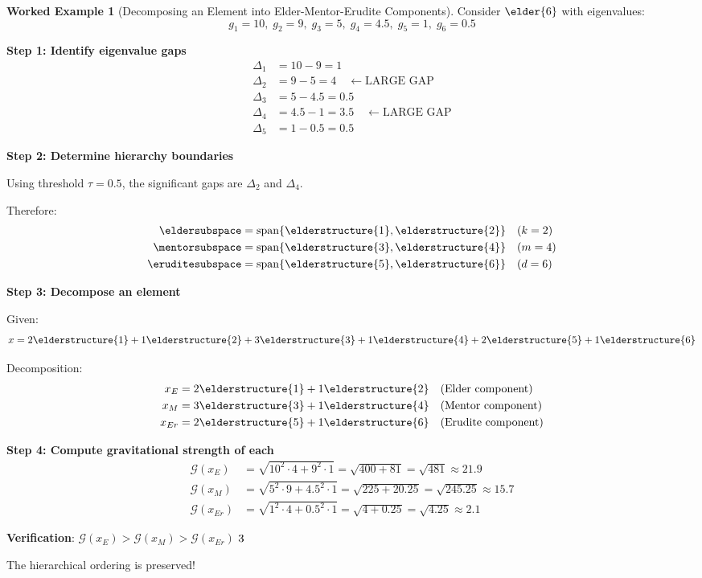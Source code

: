 \documentclass[12pt,a4paper]{article}
\newcommand{\checkmark}{\ding{51}}
\theoremstyle{definition}
\newtheorem{example}{Worked Example}[section]
\theoremstyle{remark}
\begin{document}
\begin{example}[Decomposing an Element into Elder-Mentor-Erudite Components]

Consider $\elder{6}$ with eigenvalues:
$$g_1 = 10, \; g_2 = 9, \; g_3 = 5, \; g_4 = 4.5, \; g_5 = 1, \; g_6 = 0.5$$

\textbf{Step 1: Identify eigenvalue gaps}
\begin{align}
\Delta_1 &= 10 - 9 = 1 \\
\Delta_2 &= 9 - 5 = 4 \quad \leftarrow \text{LARGE GAP} \\
\Delta_3 &= 5 - 4.5 = 0.5 \\
\Delta_4 &= 4.5 - 1 = 3.5 \quad \leftarrow \text{LARGE GAP} \\
\Delta_5 &= 1 - 0.5 = 0.5
\end{align}

\textbf{Step 2: Determine hierarchy boundaries}

Using threshold $\tau = 0.5$, the significant gaps are $\Delta_2$ and $\Delta_4$.

Therefore:
\begin{align}
\eldersubspace &= \mathrm{span}\{\elderstructure{1}, \elderstructure{2}\} \quad (k = 2) \\
\mentorsubspace &= \mathrm{span}\{\elderstructure{3}, \elderstructure{4}\} \quad (m = 4) \\
\eruditesubspace &= \mathrm{span}\{\elderstructure{5}, \elderstructure{6}\} \quad (d = 6)
\end{align}

\textbf{Step 3: Decompose an element}

Given:
$$x = 2\elderstructure{1} + 1\elderstructure{2} + 3\elderstructure{3} + 1\elderstructure{4} + 2\elderstructure{5} + 1\elderstructure{6}$$

Decomposition:
\begin{align}
x_E &= 2\elderstructure{1} + 1\elderstructure{2} \quad \text{(Elder component)} \\
x_M &= 3\elderstructure{3} + 1\elderstructure{4} \quad \text{(Mentor component)} \\
x_{Er} &= 2\elderstructure{5} + 1\elderstructure{6} \quad \text{(Erudite component)}
\end{align}

\textbf{Step 4: Compute gravitational strength of each}
\begin{align}
\mathcal{G}(x_E) &= \sqrt{10^2 \cdot 4 + 9^2 \cdot 1} = \sqrt{400 + 81} = \sqrt{481} \approx 21.9 \\
\mathcal{G}(x_M) &= \sqrt{5^2 \cdot 9 + 4.5^2 \cdot 1} = \sqrt{225 + 20.25} = \sqrt{245.25} \approx 15.7 \\
\mathcal{G}(x_{Er}) &= \sqrt{1^2 \cdot 4 + 0.5^2 \cdot 1} = \sqrt{4 + 0.25} = \sqrt{4.25} \approx 2.1
\end{align}

\textbf{Verification}: $\mathcal{G}(x_E) > \mathcal{G}(x_M) > \mathcal{G}(x_{Er})$ $\checkmark$

The hierarchical ordering is preserved!
\end{example}
\end{document}
